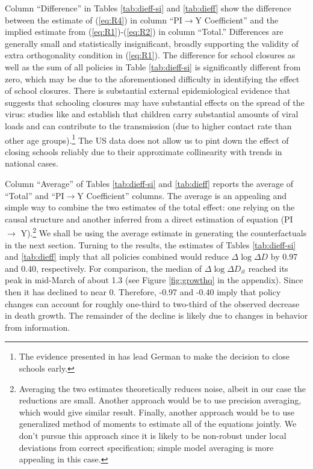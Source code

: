 \documentclass[11pt,reqno,letter]{amsart}
\theoremstyle{definition}
\renewcommand{\to}{{\rightarrow}}
\begin{document}
Column ``Difference''  in Tables   \ref{tab:dieff-si} and \ref{tab:dieff}  show the
difference between the estimate of (\ref{eq:R4}) in column  ``PI$\to$Y
Coefficient''   and the implied estimate from
(\ref{eq:R1})-(\ref{eq:R2}) in   column ``Total.''   Differences  are generally small and statistically insignificant, broadly supporting the validity of extra orthogonality condition in (\ref{eq:R1}).  The difference for school closures as well as  the sum of all policies in Table   \ref{tab:dieff-si} is significantly different from zero, which may be due to the aforementioned difficulty in identifying the effect of school closures.   There is substantial external epidemiological evidence that suggests that schooling closures may have substantial effects on the spread of the virus: studies like \cite{children:germany} and \cite{children:nature} establish that children carry substantial amounts of viral loads and can contribute to the transmission (due to higher contact rate than other age groups).\footnote{The evidence presented in \cite{children:germany}  has lead German to make the decision to close schools early.} The US data does not allow us to pint down the effect of closing schools reliably due to their approximate collinearity with trends in national cases.

Column ``Average'' of  Tables \ref{tab:dieff-si} and \ref{tab:dieff}   reports the average of
``Total'' and ``PI$\to$Y Coefficient'' columns.  The average is an appealing and simple way
to combine the two estimates of the total effect: one relying on the causal structure and another inferred from a direct estimation of equation (PI $\to$ Y).\footnote{Averaging the two estimates theoretically reduces noise, albeit in our case the reductions are small.
Another approach would be to use precision averaging, which would give similar result. Finally, another approach would be to use generalized method of moments to estimate
all of the equations jointly. We don't pursue this approach since it is likely to be non-robust under local deviations from correct specification; simple model averaging is more appealing in this case.}  We shall be using the average estimate in generating the counterfactuals in the next section. Turning to the results, the estimates of Tables \ref{tab:dieff-si} and \ref{tab:dieff}  imply that all policies combined would reduce
\(\Delta \log \Delta D\) by  0.97 and  0.40, respectively. For
comparison, the median of \(\Delta \log \Delta D_{it}\) reached its
peak in mid-March of about 1.3 (see Figure \ref{fig:growthq} in the
appendix). Since then it has declined to near 0. Therefore,  -0.97 and -0.40 imply
that policy changes can account for roughly one-third to two-third of the observed
decrease in death growth.  The remainder of the decline is likely due
to changes in behavior from information.
\end{document}
